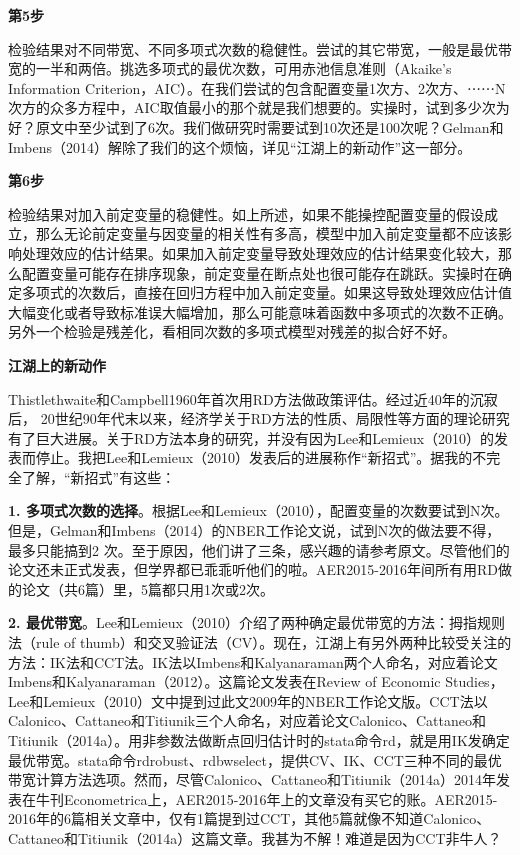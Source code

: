 \documentclass[cn,12pt,math=newtx,citestyle=gb7714-2015,bibstyle=gb7714-2015]{elegantbook}
\begin{document}
	\textbf{第5步}
	
	检验结果对不同带宽、不同多项式次数的稳健性。尝试的其它带宽，一般是最优带宽的一半和两倍。挑选多项式的最优次数，可用赤池信息准则（Akaike's Information Criterion，AIC）。在我们尝试的包含配置变量1次方、2次方、⋯⋯N次方的众多方程中，AIC取值最小的那个就是我们想要的。实操时，试到多少次为好？原文中至少试到了6次。我们做研究时需要试到10次还是100次呢？Gelman和Imbens（2014）解除了我们的这个烦恼，详见“江湖上的新动作”这一部分。
	
	\textbf{第6步}
	
	检验结果对加入前定变量的稳健性。如上所述，如果不能操控配置变量的假设成立，那么无论前定变量与因变量的相关性有多高，模型中加入前定变量都不应该影响处理效应的估计结果。如果加入前定变量导致处理效应的估计结果变化较大，那么配置变量可能存在排序现象，前定变量在断点处也很可能存在跳跃。实操时在确定多项式的次数后，直接在回归方程中加入前定变量。如果这导致处理效应估计值大幅变化或者导致标准误大幅增加，那么可能意味着函数中多项式的次数不正确。另外一个检验是残差化，看相同次数的多项式模型对残差的拟合好不好。
	
	\textbf{江湖上的新动作}
	
	Thistlethwaite和Campbell1960年首次用RD方法做政策评估。经过近40年的沉寂后， 20世纪90年代末以来，经济学关于RD方法的性质、局限性等方面的理论研究有了巨大进展。关于RD方法本身的研究，并没有因为Lee和Lemieux（2010）的发表而停止。我把Lee和Lemieux（2010）发表后的进展称作“新招式”。据我的不完全了解，“新招式”有这些：
	
	\textbf{1. 多项式次数的选择}。根据Lee和Lemieux（2010），配置变量的次数要试到N次。但是，Gelman和Imbens（2014）的NBER工作论文说，试到N次的做法要不得，最多只能搞到2 次。至于原因，他们讲了三条，感兴趣的请参考原文。尽管他们的论文还未正式发表，但学界都已乖乖听他们的啦。AER2015-2016年间所有用RD做的论文（共6篇）里，5篇都只用1次或2次。
	
	\textbf{2. 最优带宽}。Lee和Lemieux（2010）介绍了两种确定最优带宽的方法：拇指规则法（rule of thumb）和交叉验证法（CV）。现在，江湖上有另外两种比较受关注的方法：IK法和CCT法。IK法以Imbens和Kalyanaraman两个人命名，对应着论文Imbens和Kalyanaraman（2012）。这篇论文发表在Review of Economic Studies，Lee和Lemieux（2010）文中提到过此文2009年的NBER工作论文版。CCT法以Calonico、Cattaneo和Titiunik三个人命名，对应着论文Calonico、Cattaneo和Titiunik（2014a）。用非参数法做断点回归估计时的stata命令rd，就是用IK发确定最优带宽。stata命令rdrobust、rdbwselect，提供CV、IK、CCT三种不同的最优带宽计算方法选项。然而，尽管Calonico、Cattaneo和Titiunik（2014a）2014年发表在牛刊Econometrica上，AER2015-2016年上的文章没有买它的账。AER2015-2016年的6篇相关文章中，仅有1篇提到过CCT，其他5篇就像不知道Calonico、Cattaneo和Titiunik（2014a）这篇文章。我甚为不解！难道是因为CCT非牛人？
	
\end{document}
